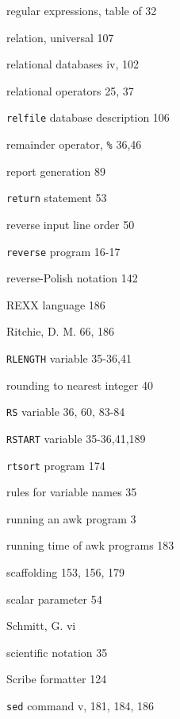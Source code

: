 \begin{multicols}{3}
\hangindent=3pc  regular expressions, table of 32

\hangindent=3pc  relation, universal 107

\hangindent=3pc  relational databases iv, 102

\hangindent=3pc  relational operators 25, 37

\hangindent=3pc  \verb'relfile' database description 106

\hangindent=3pc  remainder operator, \verb'%' 36,46

\hangindent=3pc  report generation 89

\hangindent=3pc  \verb'return' statement 53

\hangindent=3pc  reverse input line order 50

\hangindent=3pc  \verb'reverse' program 16-17

\hangindent=3pc  reverse-Polish notation 142

\hangindent=3pc  REXX language 186

\hangindent=3pc  Ritchie, D. M. 66, 186

\hangindent=3pc  \verb'RLENGTH' variable 35-36,41

\hangindent=3pc  rounding to nearest integer 40

\hangindent=3pc  \verb'RS' variable 36, 60, 83-84

\hangindent=3pc  \verb'RSTART' variable 35-36,41,189

\hangindent=3pc  \verb'rtsort' program 174

\hangindent=3pc  rules for variable names 35

\hangindent=3pc  running an awk program 3

\hangindent=3pc  running time of awk programs 183

\hangindent=3pc  scaffolding 153, 156, 179

\hangindent=3pc  scalar parameter 54

\hangindent=3pc  Schmitt, G. vi

\hangindent=3pc  scientific notation 35

\hangindent=3pc  Scribe formatter 124

\hangindent=3pc  \verb'sed' command v, 181, 184, 186


\end{multicols}
